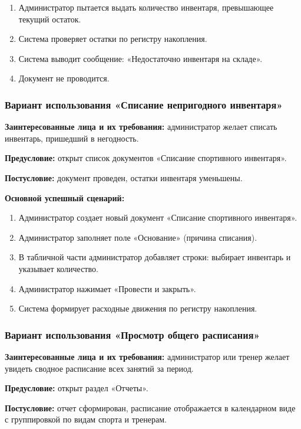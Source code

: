 \begin{enumerate}
	\item Администратор пытается выдать количество инвентаря, превышающее текущий остаток.
	\item Система проверяет остатки по регистру накопления.
	\item Система выводит сообщение: «Недостаточно инвентаря на складе».
	\item Документ не проводится.
\end{enumerate}

\subsubsection{Вариант использования «Списание непригодного инвентаря»}

\textbf{Заинтересованные лица и их требования:} администратор желает списать инвентарь, пришедший в негодность.

\textbf{Предусловие:} открыт список документов «Списание спортивного инвентаря».

\textbf{Постусловие:} документ проведен, остатки инвентаря уменьшены.

\textbf{Основной успешный сценарий:}

\begin{enumerate}
	\item Администратор создает новый документ «Списание спортивного инвентаря».
	\item Администратор заполняет поле «Основание» (причина списания).
	\item В табличной части администратор добавляет строки: выбирает инвентарь и указывает количество.
	\item Администратор нажимает «Провести и закрыть».
	\item Система формирует расходные движения по регистру накопления.
\end{enumerate}

\subsubsection{Вариант использования «Просмотр общего расписания»}

\textbf{Заинтересованные лица и их требования:} администратор или тренер желает увидеть сводное расписание всех занятий за период.

\textbf{Предусловие:} открыт раздел «Отчеты».

\textbf{Постусловие:} отчет сформирован, расписание отображается в календарном виде с группировкой по видам спорта и тренерам.

